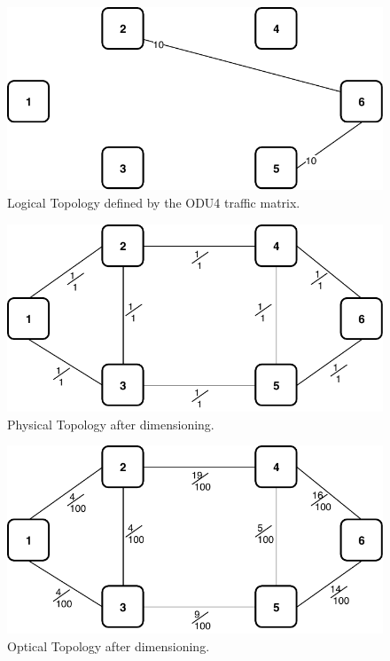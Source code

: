 \begin{figure}[h!]
\centering
\includegraphics[width=12cm]{sdf/ilp/opaque_survivability/figures/logical_topology_ODU4_medium}
\caption{Logical Topology defined by the ODU4 traffic matrix.}
\label{logical_ODU4_medium}
\end{figure}
\newpage
\begin{figure}[h!]
\centering
\includegraphics[width=13cm]{sdf/ilp/opaque_survivability/figures/physical_topology}
\caption{Physical Topology after dimensioning.}
\label{physical_medium}
\end{figure}

\begin{figure}[h!]
\centering
\includegraphics[width=13cm]{sdf/ilp/opaque_survivability/figures/optical_topology_medium}
\caption{Optical Topology after dimensioning.}
\label{optical_medium}
\end{figure}

